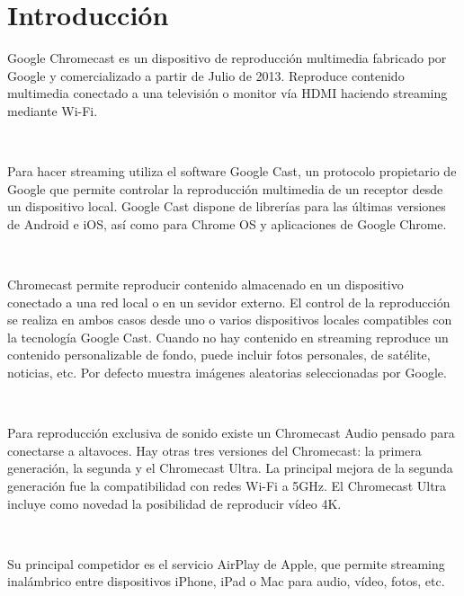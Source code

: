 \section{Introducción}
Google Chromecast es un dispositivo de reproducción multimedia fabricado por Google y comercializado a partir de Julio de 2013. Reproduce contenido multimedia conectado a una televisión o monitor vía HDMI haciendo streaming mediante Wi-Fi.

\

Para hacer streaming utiliza el software Google Cast, un protocolo propietario de Google que permite controlar la reproducción multimedia de un receptor desde un dispositivo local. Google Cast dispone de librerías para las últimas versiones de Android e iOS, así como para Chrome OS y aplicaciones de Google Chrome.

\

Chromecast permite reproducir contenido almacenado en un dispositivo conectado a una red local o en un sevidor externo. El control de la reproducción se realiza en ambos casos desde uno o varios dispositivos locales compatibles con la tecnología Google Cast. Cuando no hay contenido en streaming reproduce un contenido personalizable de fondo, puede incluir fotos personales,
de satélite, noticias, etc. Por defecto muestra imágenes aleatorias seleccionadas por Google.

\

Para reproducción exclusiva de sonido existe un Chromecast Audio pensado para conectarse a altavoces. Hay otras tres versiones del Chromecast: la primera generación, la segunda y el Chromecast Ultra. La principal mejora de la segunda generación fue la compatibilidad con redes Wi-Fi a 5GHz. El Chromecast Ultra incluye como novedad la posibilidad de reproducir vídeo 4K.

\

Su principal competidor es el servicio AirPlay de Apple, que permite streaming inalámbrico entre dispositivos iPhone, iPad o Mac para audio, vídeo, fotos, etc.
